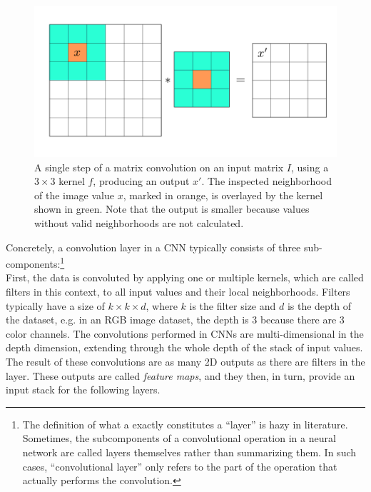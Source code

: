 \begin {figure}[!ht]
	\begin{center}
		\includegraphics[scale=0.55]{img/fig_convolution}
	\end{center}
	\caption[Matrix convolution.]{A single step of a matrix convolution on an input matrix $I$, using a $3 \times 3$ kernel $f$, producing an output $x'$. The inspected neighborhood of the image value $x$, marked in orange, is overlayed by the kernel shown in green. Note that the output is smaller because values without valid neighborhoods are not calculated.}
	\label{fig:convolution}
\end {figure}

\noindent Concretely, a convolution layer in a CNN typically consists of three sub-components:\footnote{The definition of what a exactly constitutes a ``layer'' is hazy in literature. Sometimes, the subcomponents of a convolutional operation in a neural network are called layers themselves rather than summarizing them. In such cases, ``convolutional layer'' only refers to the part of the operation that actually performs the convolution.}\\

\noindent First, the data is convoluted by applying one or multiple kernels, which are called filters in this context, to all input values and their local neighborhoods. Filters typically have a size of $k \times k \times d$, where $k$ is the filter size and $d$ is the depth of the dataset, e.g. in an RGB image dataset, the depth is 3 because there are 3 color channels. The convolutions performed in CNNs are multi-dimensional in the depth dimension, extending through the whole depth of the stack of input values. The result of these convolutions are as many 2D outputs as there are filters in the layer. These outputs are called \textit{feature maps}, and they then, in turn, provide an input stack for the following layers.

